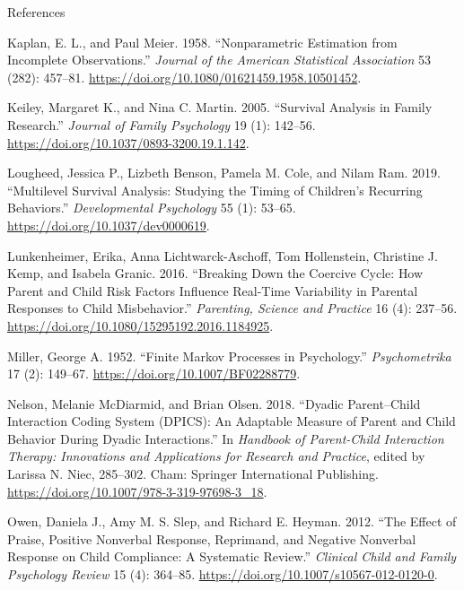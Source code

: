 \documentclass[
  ignorenonframetext,
]{beamer}
\newlength{\cslhangindent}
\newenvironment{CSLReferences}[2] %
 {\begin{list}{}{%
  \setlength{\itemindent}{0pt}
  \setlength{\leftmargin}{0pt}
  \setlength{\parsep}{0pt}
  \ifodd #1
   \setlength{\leftmargin}{\cslhangindent}
   \setlength{\itemindent}{-1\cslhangindent}
  \fi
  \setlength{\itemsep}{#2\baselineskip}}}
 {\end{list}}
\begin{document}
\begin{frame}{References}
\begin{CSLReferences}{1}{0}
Kaplan, E. L., and Paul Meier. 1958. {``Nonparametric {Estimation} from
{Incomplete Observations}.''} \emph{Journal of the American Statistical
Association} 53 (282): 457--81.
\url{https://doi.org/10.1080/01621459.1958.10501452}.

Keiley, Margaret K., and Nina C. Martin. 2005. {``Survival {Analysis} in
{Family Research}.''} \emph{Journal of Family Psychology} 19 (1):
142--56. \url{https://doi.org/10.1037/0893-3200.19.1.142}.

Lougheed, Jessica P., Lizbeth Benson, Pamela M. Cole, and Nilam Ram.
2019. {``Multilevel {Survival Analysis}: {Studying} the {Timing} of
{Children}'s {Recurring Behaviors}.''} \emph{Developmental Psychology}
55 (1): 53--65. \url{https://doi.org/10.1037/dev0000619}.

Lunkenheimer, Erika, Anna Lichtwarck-Aschoff, Tom Hollenstein, Christine
J. Kemp, and Isabela Granic. 2016. {``Breaking {Down} the {Coercive
Cycle}: {How Parent} and {Child Risk Factors Influence Real-Time
Variability} in {Parental Responses} to {Child Misbehavior}.''}
\emph{Parenting, Science and Practice} 16 (4): 237--56.
\url{https://doi.org/10.1080/15295192.2016.1184925}.

Miller, George A. 1952. {``Finite Markov Processes in Psychology.''}
\emph{Psychometrika} 17 (2): 149--67.
\url{https://doi.org/10.1007/BF02288779}.

Nelson, Melanie McDiarmid, and Brian Olsen. 2018. {``Dyadic
{Parent}--{Child Interaction Coding System} ({DPICS}): {An Adaptable
Measure} of {Parent} and {Child Behavior During Dyadic Interactions}.''}
In \emph{Handbook of {Parent-Child Interaction Therapy}: {Innovations}
and {Applications} for {Research} and {Practice}}, edited by Larissa N.
Niec, 285--302. Cham: Springer International Publishing.
\url{https://doi.org/10.1007/978-3-319-97698-3_18}.

Owen, Daniela J., Amy M. S. Slep, and Richard E. Heyman. 2012. {``The
Effect of Praise, Positive Nonverbal Response, Reprimand, and Negative
Nonverbal Response on Child Compliance: A Systematic Review.''}
\emph{Clinical Child and Family Psychology Review} 15 (4): 364--85.
\url{https://doi.org/10.1007/s10567-012-0120-0}.


\end{CSLReferences}
\end{frame}
\end{document}
